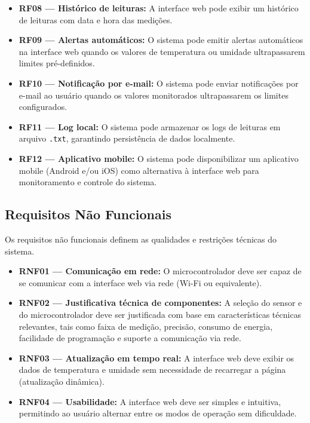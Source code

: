 \begin{itemize}
    \item \textbf{RF08 — Histórico de leituras:} A interface web pode exibir um
    histórico de leituras com data e hora das medições.

    \item \textbf{RF09 — Alertas automáticos:} O sistema pode emitir alertas
    automáticos na interface web quando os valores de temperatura ou umidade
    ultrapassarem limites pré-definidos.

    \item \textbf{RF10 — Notificação por e-mail:} O sistema pode enviar notificações
    por e-mail ao usuário quando os valores monitorados ultrapassarem os limites
    configurados.

    \item \textbf{RF11 — Log local:} O sistema pode armazenar os logs de leituras em
    arquivo \texttt{.txt}, garantindo persistência de dados localmente.

    \item \textbf{RF12 — Aplicativo mobile:} O sistema pode disponibilizar um aplicativo
    mobile (Android e/ou iOS) como alternativa à interface web para monitoramento e
    controle do sistema.
\end{itemize}

\subsection{Requisitos Não Funcionais}

Os requisitos não funcionais definem as qualidades e restrições técnicas do sistema.

\begin{itemize}
    \item \textbf{RNF01 — Comunicação em rede:} O microcontrolador deve ser capaz
    de se comunicar com a interface web via rede (Wi-Fi ou equivalente).

    \item \textbf{RNF02 — Justificativa técnica de componentes:} A seleção do sensor
    e do microcontrolador deve ser justificada com base em características técnicas
    relevantes, tais como faixa de medição, precisão, consumo de energia, facilidade
    de programação e suporte a comunicação via rede.

    \item \textbf{RNF03 — Atualização em tempo real:} A interface web deve exibir
    os dados de temperatura e umidade sem necessidade de recarregar a página
    (atualização dinâmica).

    \item \textbf{RNF04 — Usabilidade:} A interface web deve ser simples e intuitiva,
    permitindo ao usuário alternar entre os modos de operação sem dificuldade.
\end{itemize}
